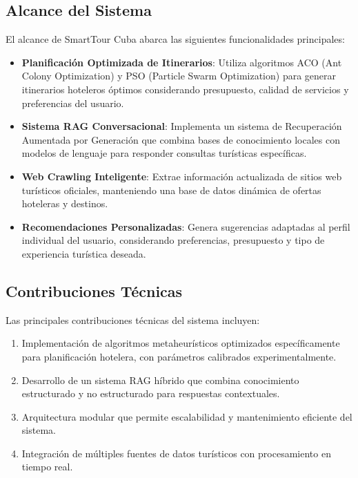 \documentclass[runningheads]{llncs}
\begin{document}
\subsection{Alcance del Sistema}

El alcance de SmartTour Cuba abarca las siguientes funcionalidades principales:

\begin{itemize}
\item \textbf{Planificación Optimizada de Itinerarios}: Utiliza algoritmos ACO (Ant Colony Optimization) y PSO (Particle Swarm Optimization) para generar itinerarios hoteleros óptimos considerando presupuesto, calidad de servicios y preferencias del usuario.

\item \textbf{Sistema RAG Conversacional}: Implementa un sistema de Recuperación Aumentada por Generación que combina bases de conocimiento locales con modelos de lenguaje para responder consultas turísticas específicas.

\item \textbf{Web Crawling Inteligente}: Extrae información actualizada de sitios web turísticos oficiales, manteniendo una base de datos dinámica de ofertas hoteleras y destinos.

\item \textbf{Recomendaciones Personalizadas}: Genera sugerencias adaptadas al perfil individual del usuario, considerando preferencias, presupuesto y tipo de experiencia turística deseada.


\end{itemize}

\subsection{Contribuciones Técnicas}

Las principales contribuciones técnicas del sistema incluyen:

\begin{enumerate}
\item Implementación de algoritmos metaheurísticos optimizados específicamente para planificación hotelera, con parámetros calibrados experimentalmente.

\item Desarrollo de un sistema RAG híbrido que combina conocimiento estructurado y no estructurado para respuestas contextuales.

\item Arquitectura modular que permite escalabilidad y mantenimiento eficiente del sistema.

\item Integración de múltiples fuentes de datos turísticos con procesamiento en tiempo real.
\end{enumerate}
\end{document}
